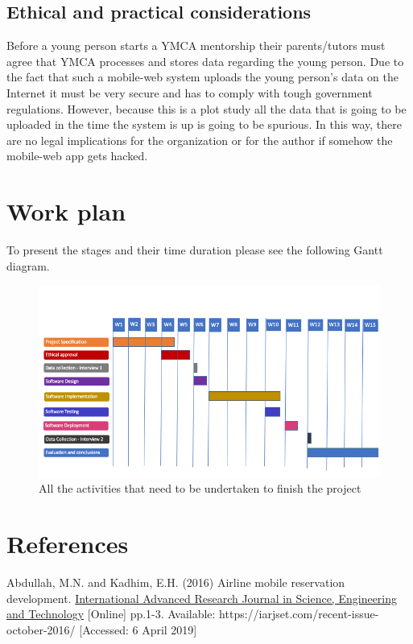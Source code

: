 \documentclass[version=last,fontsize=13pt]{scrartcl}
\begin{document}
\subsection{Ethical and practical considerations}
	Before a young person starts a YMCA mentorship their parents/tutors must agree that YMCA processes and stores data regarding the young person. Due to the fact that such a mobile-web system uploads the young person's data on the Internet it must be very secure and has to comply with tough government regulations. However, because this is a plot study all the data that is going to be uploaded in the time the system is up is going to be spurious. In this way, there are no legal implications for the organization or for the author if somehow the mobile-web app gets hacked. 

\pagebreak
\section{Work plan}%
To present the stages and their time duration please see the following Gantt diagram.

	\begin{figure}[H]

		\includegraphics[scale = 0.5]{./imgs/ganttChart}
		\caption{All the activities that need to be undertaken to finish the project}
		\label{gC}

	\end{figure}

\pagebreak

\section*{References}
Abdullah, M.N. and Kadhim, E.H. (2016) Airline mobile reservation development.  \underline{International Advanced Research Journal in Science, Engineering and Technology} [Online]  pp.1-3. Available: https://iarjset.com/recent-issue-october-2016/ [Accessed: 6 April 2019]\\
\end{document}
